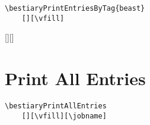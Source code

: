 \documentclass[itdr]{subfiles}
\begin{document}
\begin{lstlisting}
\bestiaryPrintEntriesByTag{beast}
	[][\vfill]
\end{lstlisting}

[][\vfill]


\section{Print All Entries}

\begin{lstlisting}
\bestiaryPrintAllEntries
	[][\vfill][\jobname]
\end{lstlisting}

\bestiaryPrintAllEntries[][\vfill]
\end{document}
